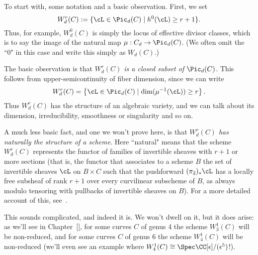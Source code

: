 To start with, some notation and a basic observation. First, we set
$$
W^r_d(C) := \{ \cL \in \Pic_d(C) \mid h^0(\cL) \geq r+1 \}.
$$
Thus, for example, $W^0_d(C)$ is simply the locus of effective divisor classes, which is to say the image of the natural map $\mu : C_d \to \Pic_d(C)$. (We often omit the ``0" in this case and write this simply as $W_d(C)$.)

The basic observation is that \emph{$W^r_d(C)$ is a closed subset of $\Pic_d(C)$}. This follows from upper-semicontinuity of fiber dimension, since we can write
$$
W^r_d(C) = \left\{ \cL \in \Pic_d(C) \mid \dim(\mu^{-1}(\cL)) \geq r \right\}.
$$
Thus $W^r_d(C)$ has the structure of an algebraic variety, and we can talk about its dimension, irreducibility, smoothness or singularity and so on.

A much less basic fact, and one we won't prove here, is that \emph{$W^r_d(C)$ has naturally the structure of a scheme}. Here ``natural" means that the scheme $W^r_d(C)$ represents the functor of families of invertible sheaves with $r+1$ or more sections (that is, the functor that associates to a scheme $B$ the set of invertible sheaves $\cL$ on $B \times C$ such that the pushforward $(\pi_2)_*\cL$ has a locally free subsheaf of rank $r+1$ over every curvilinear subscheme of $B$, as always modulo tensoring with pullbacks of invertible sheaves on $B$). For a more detailed account of this, see~\cite{ACGH}.

This sounds complicated, and indeed it is. We won't  dwell on it, but it does arise: as we'll see in Chapter~\ref{}, for some curves $C$ of genus 4 the scheme $W^1_3(C)$ will be non-reduced, and for some curves $C$ of genus 6 the scheme $W^1_4(C)$ will be non-reduced (we'll even see an example where $W^1_4(C) \cong \Spec \CC[\epsilon]/(\epsilon^5)$!). 

%
%

